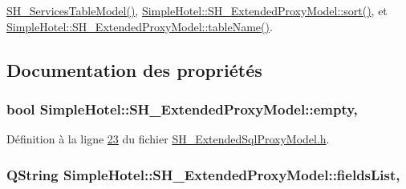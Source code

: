 \hyperlink{classSimpleHotel_1_1SH__ServicesTableModel_a109c343989f5fec1ed380c2bcc50c432}{S\-H\-\_\-\-Services\-Table\-Model()}, \hyperlink{classSimpleHotel_1_1SH__ExtendedProxyModel_a5d7686a9fae295e0662057b8450c8a8d}{Simple\-Hotel\-::\-S\-H\-\_\-\-Extended\-Proxy\-Model\-::sort()}, et \hyperlink{classSimpleHotel_1_1SH__ExtendedProxyModel_a49617ea8bab745425beec3dbd3fddba7}{Simple\-Hotel\-::\-S\-H\-\_\-\-Extended\-Proxy\-Model\-::table\-Name()}.



\subsection{Documentation des propriétés}
\hypertarget{classSimpleHotel_1_1SH__ExtendedProxyModel_a45f47ab859c5443353977e22417de357}{
\subsubsection[{empty}]{\setlength{\rightskip}{0pt plus 5cm}bool Simple\-Hotel\-::\-S\-H\-\_\-\-Extended\-Proxy\-Model\-::empty\hspace{0.3cm}{\ttfamily [read]}, {\ttfamily [inherited]}}}\label{classSimpleHotel_1_1SH__ExtendedProxyModel_a45f47ab859c5443353977e22417de357}


Définition à la ligne \hyperlink{SH__ExtendedSqlProxyModel_8h_source_l00023}{23} du fichier \hyperlink{SH__ExtendedSqlProxyModel_8h_source}{S\-H\-\_\-\-Extended\-Sql\-Proxy\-Model.\-h}.

\hypertarget{classSimpleHotel_1_1SH__ExtendedProxyModel_a8872cff3d50bf25b1673ed2c951eeb4a}{
\subsubsection[{fields\-List}]{\setlength{\rightskip}{0pt plus 5cm}Q\-String Simple\-Hotel\-::\-S\-H\-\_\-\-Extended\-Proxy\-Model\-::fields\-List\hspace{0.3cm}{\ttfamily [read]}, {\ttfamily [inherited]}}}\label{classSimpleHotel_1_1SH__ExtendedProxyModel_a8872cff3d50bf25b1673ed2c951eeb4a}


